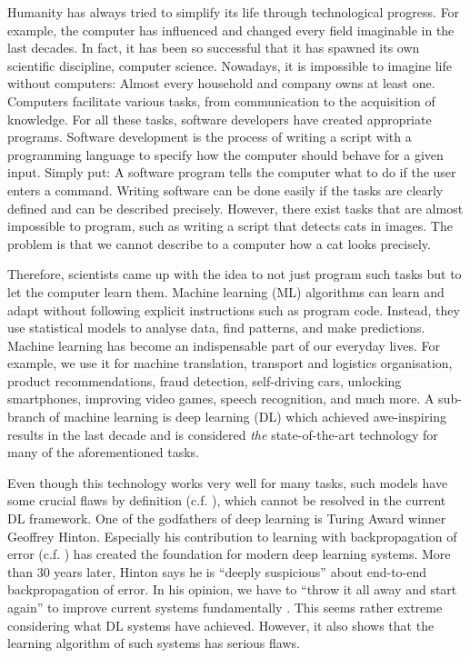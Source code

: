 Humanity has always tried to simplify its life through technological progress.
For example, the computer has influenced and changed every field imaginable in the last decades. 
In fact, it has been so successful that it has spawned its own scientific discipline, computer science.
Nowadays, it is impossible to imagine life without computers: Almost every household and company owns at least one.
Computers facilitate various tasks, from communication to the acquisition of knowledge.
For all these tasks, software developers have created appropriate programs.
Software development is the process of writing a script with a programming language to specify how the computer should behave for a given input.
Simply put: A software program tells the computer what to do if the user enters a command.
Writing software can be done easily if the tasks are clearly defined and can be described precisely.
However, there exist tasks that are almost impossible to program, such as writing a script that detects cats in images.
The problem is that we cannot describe to a computer how a cat looks precisely.

Therefore, scientists came up with the idea to not just program such tasks but to let the computer learn them.
Machine learning (ML) algorithms can learn and adapt without following explicit instructions such as program code.
Instead, they use statistical models to analyse data, find patterns, and make predictions.
Machine learning has become an indispensable part of our everyday lives.
For example, we use it for machine translation, transport and logistics organisation, product recommendations, fraud detection, self-driving cars, unlocking smartphones, improving video games, speech recognition, and much more.
A sub-branch of machine learning is deep learning (DL) which achieved awe-inspiring results in the last decade and is considered \emph{the} state-of-the-art technology for many of the aforementioned tasks.

Even though this technology works very well for many tasks, such models have some crucial flaws by definition (c.f. ), which cannot be resolved in the current DL framework.
One of the godfathers of deep learning is Turing Award winner Geoffrey Hinton. 
Especially his contribution to learning with backpropagation of error (c.f. ) has created the foundation for modern deep learning systems.
More than 30 years later, Hinton says he is ``deeply suspicious'' about end-to-end backpropagation of error. In his opinion, we have to ``throw it all away and start again'' to improve current systems fundamentally .
This seems rather extreme considering what DL systems have achieved.
However, it also shows that the learning algorithm of such systems has serious flaws.


